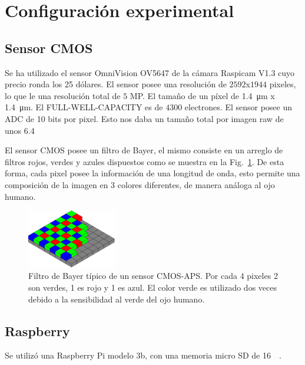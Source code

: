 \documentclass[twoside,twocolumn]{article}
\begin{document}
  \section{Configuración experimental}

    \subsection{Sensor CMOS}
      Se ha utilizado el sensor OmniVision OV5647 de la cámara Raspicam V1.3 cuyo precio ronda los 25 dólares.
      El sensor posee una resolución de	$2592$x$1944$ pixeles, lo que le una resolución total de $5$ MP.
      El tamaño de un píxel de \SI{1.4}{\micro\meter} x \SI{1.4}{\micro\meter}.
      El FULL-WELL-CAPACITY es de $4300$ electrones. %
      El sensor posee un ADC de 10 bits por pixel.
      Esto nos daba un tamaño total por imagen raw de unos \SI{6.4}{\mega\byte}

      El sensor CMOS posee un filtro de Bayer, el mismo consiste en un arreglo de filtros rojos, verdes y azules
      dispuestos como se muestra en la Fig.~\ref{fig:bayer}. De esta forma, cada pixel posee la información de una longitud de onda,
      esto permite una composición de la imagen en 3 colores diferentes, de manera análoga al ojo humano.

      \begin{figure}[h]
        \includegraphics[width=0.35\textwidth]{figures/Bayer_pattern.png}
        \caption{Filtro de Bayer típico de un sensor CMOS-APS. Por cada 4 pixeles 2 son verdes, 1 es rojo y 1 es azul.
          El color verde es utilizado dos veces debido a la sensibilidad al verde del ojo humano.}
        \label{fig:bayer}
      \end{figure}


    \subsection{Raspberry}
    Se utilizó una Raspberry Pi modelo 3b, con una memoria micro SD de \SI{16}{\giga\byte}.
\end{document}
